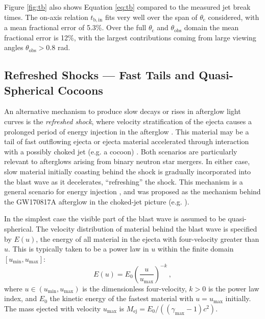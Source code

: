 \documentclass[twocolumn]{aastex62}
\newcommand{\gwbns}{GW170817A}
\newcommand{\Mej}{\ensuremath{M_{\mathrm{ej}}}}
\newcommand{\tbin}{\ensuremath{t_{\mathrm{b, in}}}}
\newcommand{\thobs}{\ensuremath{\theta_{\mathrm{obs}}}}
\newcommand{\thC}{\ensuremath{\theta_{\mathrm{c}}}}
\newcommand{\umin}{\ensuremath{u_{\mathrm{min}}}}
\newcommand{\umax}{\ensuremath{u_{\mathrm{max}}}}
\newcommand{\gmax}{\ensuremath{\gamma_{\mathrm{max}}}}
\begin{document}
Figure \ref{fig:tb} also shows Equation \eqref{eq:tb} compared to the measured jet break times.  The on-axis relation $\tbin$ fits very well over the span of $\thC$ considered, with a mean fractional error of 5.3\%.  Over the full $\thC$ and $\thobs$ domain the mean fractional error is 12\%, with the largest contributions coming from large viewing angles $\thobs > 0.8$ rad.


\subsection{Refreshed Shocks --- Fast Tails and Quasi-Spherical Cocoons}\label{subsec:refreshedShocks}

An alternative mechanism to produce slow decays or rises in afterglow light curves is the \emph{refreshed shock}, where velocity stratification of the ejecta causes a prolonged period of energy injection in the afterglow \citep{Rees:1998aa, Panaitescu:1998aa, Sari:2000aa}.  This material may be a tail of fast outflowing ejecta or ejecta material accelerated through interaction with a possibly choked jet (e.g. a cocoon) \citep{Nakar:2011aa, Hotokezaka:2015aa}.  Both scenarios are particularly relevant to afterglows arising from binary neutron star mergers.  In either case, slow material initially coasting behind the shock is gradually incorporated into the blast wave as it decelerates, ``refreshing'' the shock.  This mechanism is a general scenario for energy injection \citep{Zhang:2006aa}, and was proposed as the mechanism behind the \gwbns{} afterglow in the choked-jet picture (e.g. \citep{Mooley:2018aa, Nakar:2018aa}).

In the simplest case the visible part of the blast wave is assumed to be quasi-spherical.  The velocity distribution of material behind the blast wave is specified by $E(u)$, the energy of all material in the ejecta with four-velocity greater than $u$.  This is typically taken to be a power law in $u$ within the finite domain $[\umin, \umax]$:
\begin{equation}
	E(u) = E_0 \left(\frac{u}{\umax}\right)^{-k}\ , \label{eq:Eu}
\end{equation}
where $u \in (\umin, \umax)$ is the dimensionless four-velocity, $k>0$ is the power law index, and $E_0$ the kinetic energy of the fastest material with $u=\umax$ initially.  The mass ejected with velocity $\umax$ is $\Mej = E_0 / ((\gmax -1)c^2)$.
\end{document}
